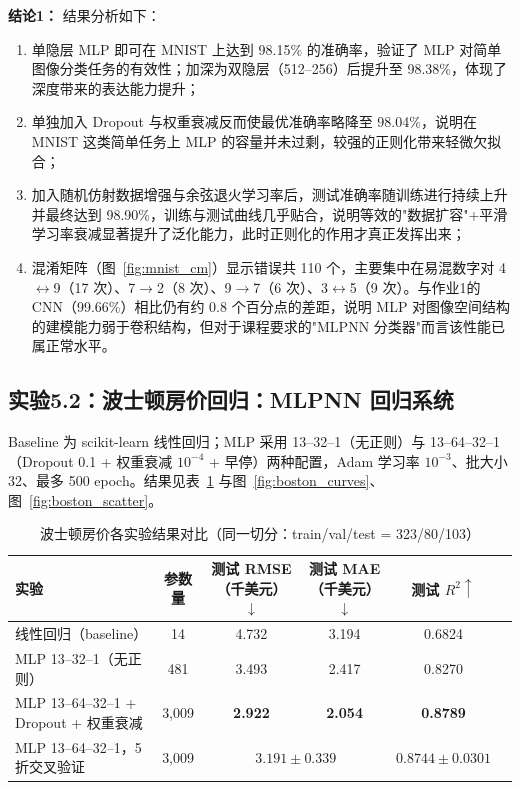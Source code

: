\documentclass[UTF8,zihao=-4]{ctexart}
\newcommand{\mlExperiment}[2]{\subsection{实验#1：#2}}
\newcommand{\mlConclusion}[1]{\par\noindent\textbf{结论#1：}}
\begin{document}
\mlConclusion{1}
结果分析如下：
\begin{enumerate}
  \item 单隐层 MLP 即可在 MNIST 上达到 98.15\% 的准确率，验证了 MLP 对简单图像分类任务的有效性；加深为双隐层（512--256）后提升至 98.38\%，体现了深度带来的表达能力提升；
  \item 单独加入 Dropout 与权重衰减反而使最优准确率略降至 98.04\%，说明在 MNIST 这类简单任务上 MLP 的容量并未过剩，较强的正则化带来轻微欠拟合；
  \item 加入随机仿射数据增强与余弦退火学习率后，测试准确率随训练进行持续上升并最终达到 98.90\%，训练与测试曲线几乎贴合，说明等效的"数据扩容"+平滑学习率衰减显著提升了泛化能力，此时正则化的作用才真正发挥出来；
  \item 混淆矩阵（图~\ref{fig:mnist_cm}）显示错误共 110 个，主要集中在易混数字对 4$\leftrightarrow$9（17 次）、7$\to$2（8 次）、9$\to$7（6 次）、3$\leftrightarrow$5（9 次）。与作业1的 CNN（99.66\%）相比仍有约 0.8 个百分点的差距，说明 MLP 对图像空间结构的建模能力弱于卷积结构，但对于课程要求的"MLPNN 分类器"而言该性能已属正常水平。
\end{enumerate}

\mlExperiment{5.2}{波士顿房价回归：MLPNN 回归系统}
Baseline 为 scikit-learn 线性回归；MLP 采用 13--32--1（无正则）与 13--64--32--1（Dropout 0.1 + 权重衰减 $10^{-4}$ + 早停）两种配置，Adam 学习率 $10^{-3}$、批大小 32、最多 500 epoch。结果见表~\ref{tab:boston} 与图~\ref{fig:boston_curves}、图~\ref{fig:boston_scatter}。

\begin{table}[H]
  \centering
  \caption{波士顿房价各实验结果对比（同一切分：train/val/test = 323/80/103）}
  \label{tab:boston}
  \begin{tabular}{lccccc}
    \toprule
    实验 & 参数量 & 测试 RMSE（千美元）$\downarrow$ & 测试 MAE（千美元）$\downarrow$ & 测试 $R^2\uparrow$ \\
    \midrule
    线性回归（baseline） & 14 & 4.732 & 3.194 & 0.6824 \\
    MLP 13--32--1（无正则） & 481 & 3.493 & 2.417 & 0.8270 \\
    MLP 13--64--32--1 + Dropout + 权重衰减 & 3,009 & \textbf{2.922} & \textbf{2.054} & \textbf{0.8789} \\
    \midrule
    MLP 13--64--32--1，5 折交叉验证 & 3,009 & \multicolumn{2}{c}{$3.191\pm0.339$} & $0.8744\pm0.0301$ \\
    \bottomrule
  \end{tabular}
\end{table}
\end{document}
